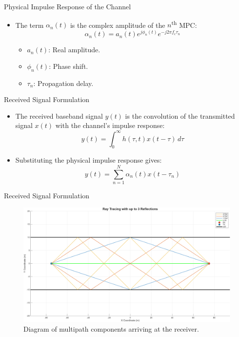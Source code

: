 \documentclass{beamer}
\begin{document}
	\begin{frame}{Physical Impulse Response of the Channel}
		\begin{itemize}
			\item The term $\alpha_n(t)$ is the complex amplitude of the $n$\textsuperscript{th} MPC:
			\[
			\alpha_n(t) = a_n(t) e^{j\phi_n(t)} e^{-j2\pi f_c \tau_n}
			\]
			\begin{itemize}
				\item $a_n(t)$: Real amplitude.
				\item $\phi_n(t)$: Phase shift.
				\item $\tau_n$: Propagation delay.
			\end{itemize}
		\end{itemize}
	\end{frame}
	
	\begin{frame}{Received Signal Formulation}
		\begin{itemize}
			\item The received baseband signal $y(t)$ is the convolution of the transmitted signal $x(t)$ with the channel's impulse response:
			\[
			y(t) = \int_0^{\infty} h(\tau, t) x(t - \tau) \, d\tau
			\]
			\item Substituting the physical impulse response gives:
			\[
			y(t) = \sum_{n=1}^{N} \alpha_n(t) x(t - \tau_n)
			\]
		\end{itemize}
	\end{frame}
	
	\begin{frame}{Received Signal Formulation}
		\begin{figure}
			\centering
			\includegraphics[width=0.9\linewidth]{"pictures/ray-tracing-3-reflections.png"}
			\caption{Diagram of multipath components arriving at the receiver.}
		\end{figure}
	\end{frame}
	
\end{document}
